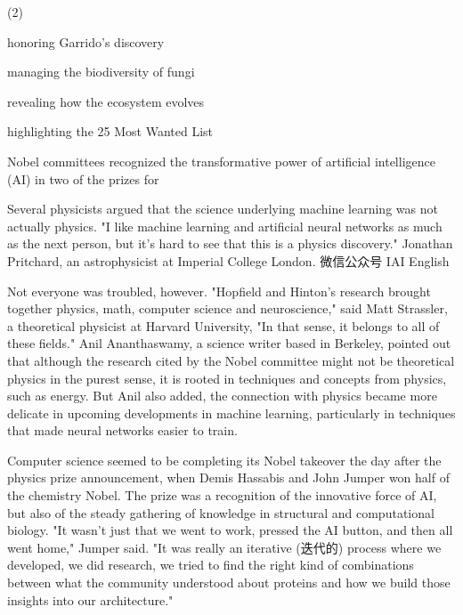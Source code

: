 \documentclass{英语试卷}
\begin{document}
\begin{choices}(2)
  \item honoring Garrido's discovery
  \item managing the biodiversity of fungi
  \item revealing how the ecosystem evolves
  \item highlighting the 25 Most Wanted List
\end{choices}
\par Nobel committees recognized the transformative power of artificial intelligence (AI) in two of the prizes for\par
\par Several physicists argued that the science underlying machine learning was not actually physics. "I like machine learning and artificial neural networks as much as the next person, but it's hard to see that this is a physics discovery." Jonathan Pritchard, an astrophysicist at Imperial College London. 微信公众号 IAI English\par
\par Not everyone was troubled, however. "Hopfield and Hinton's research brought together physics, math, computer science and neuroscience," said Matt Strassler, a theoretical physicist at Harvard University, "In that sense, it belongs to all of these fields." Anil Ananthaswamy, a science writer based in Berkeley, pointed out that although the research cited by the Nobel committee might not be theoretical physics in the purest sense, it is rooted in techniques and concepts from physics, such as energy. But Anil also added, the connection with physics became more delicate in upcoming developments in machine learning, particularly in techniques that made neural networks easier to train.\par
\par Computer science seemed to be completing its Nobel takeover the day after the physics prize announcement, when Demis Hassabis and John Jumper won half of the chemistry Nobel. The prize was a recognition of the innovative force of AI, but also of the steady gathering of knowledge in structural and computational biology. "It wasn't just that we went to work, pressed the AI button, and then all went home," Jumper said. "It was really an iterative (迭代的) process where we developed, we did research, we tried to find the right kind of combinations between what the community understood about proteins and how we build those insights into our architecture."\par
\end{document}
